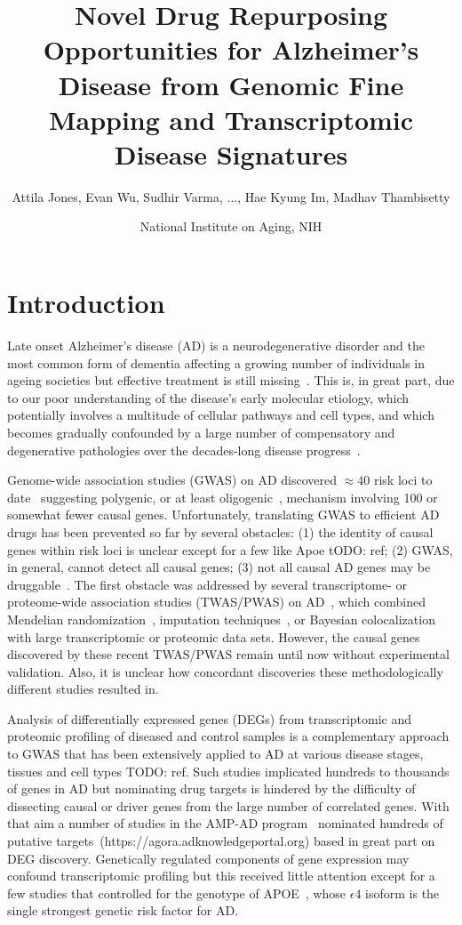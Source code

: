 \documentclass[letterpaper]{article}
\title{Novel Drug Repurposing Opportunities for Alzheimer's Disease from
  Genomic Fine Mapping and Transcriptomic Disease Signatures}
\author{Attila Jones, Evan Wu, Sudhir Varma, ..., Hae Kyung Im, Madhav Thambisetty}
\date{National Institute on Aging, NIH}
\begin{document}
\maketitle

\section{Introduction}

Late onset Alzheimer's disease (AD) is a neurodegenerative disorder and the most
common form of dementia affecting a growing number of individuals in ageing
societies but effective treatment is still
missing~\citep{Bondi2017,Masters2015}.  This is, in great part,
due to our poor understanding of the disease's early molecular etiology,
which potentially involves a multitude of cellular pathways and cell types,
and which becomes gradually confounded by a large number of compensatory
and degenerative pathologies over the decades-long disease
progress~\citep{DeStrooper2016}.

Genome-wide association studies (GWAS) on AD discovered $\approx 40$ risk loci
to date~\citep{Jansen2019,Kunkle2019,Schwartzentruber2021,Wightman2021}
suggesting polygenic, or at least oligogenic~\citep{Zhang2020}, mechanism
involving 100 or somewhat fewer causal genes.  Unfortunately, translating GWAS to
efficient AD drugs has been prevented so far by several obstacles: (1) the
identity of causal genes within risk loci is unclear except for a few like
Apoe tODO: ref; (2) GWAS, in general, cannot detect all causal genes; (3) not
all causal AD genes may be
druggable~\citep{Cao2014,Lau2020,Floris2018,Finan2017}.  The first obstacle
was addressed by several transcriptome- or proteome-wide association
studies (TWAS/PWAS) on
AD~\citep{Jansen2019,Kunkle2019,Gerring2020,Baird2021,Schwartzentruber2021,Wingo2021},
which combined Mendelian randomization~\citep{DaveySmith2014,Lawlor2008},
imputation techniques~\citep{Barbeira2018,Barbeira2019a}, or Bayesian
colocalization~\citep{Wen2017} with large transcriptomic or proteomic data
sets.  However, the causal genes discovered by these recent TWAS/PWAS remain
until now without experimental validation.  Also, it is unclear how concordant
discoveries these methodologically different studies resulted in.

Analysis of differentially expressed genes (DEGs) from transcriptomic and
proteomic profiling of diseased and control samples is a complementary
approach to GWAS that has been extensively applied to AD at various disease
stages, tissues and cell types TODO: ref.  Such studies implicated hundreds to
thousands of genes in AD but nominating drug targets is hindered by the
difficulty of dissecting causal or driver genes from the large number of
correlated genes.  With that aim a number of studies in the AMP-AD
program~\citep{Greenwood2020} nominated hundreds of putative
targets~(https://agora.adknowledgeportal.org) based in
great part on DEG discovery.  Genetically regulated components of gene
expression may confound transcriptomic profiling but this received little attention
except for a few studies that controlled for the genotype of
APOE~\citep{Taubes2021,Lin2018,RobertsJackson2021}, whose $\epsilon 4$
isoform is the single strongest genetic risk factor for AD.
\end{document}
